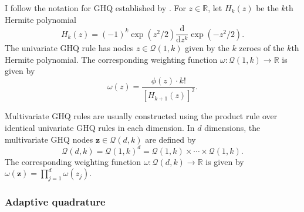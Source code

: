 \documentclass[a4paper, nobind]{templates/ociamthesis}
\begin{document}
I follow the notation for GHQ established by \textcite{bilodeau2022stochastic}.
For \(z \in \mathbb{R}\), let \(H_k(z)\) be the \(k\)th Hermite polynomial
\begin{equation}
H_k(z) = (-1)^k \exp(z^2 / 2) \frac{\text{d}}{\text{d}z^k} \exp(-z^2 / 2).
\end{equation}
The univariate GHQ rule has nodes \(z \in \mathcal{Q}(1, k)\) given by the \(k\) zeroes of the \(k\)th Hermite polynomial.
The corresponding weighting function \(\omega: \mathcal{Q}(1, k) \to \mathbb{R}\) is given by
\begin{equation}
\omega(z) = \frac{\phi(z) \cdot k!}{[H_{k + 1}(z)]^2}.
\end{equation}

Multivariate GHQ rules are usually constructed using the product rule over identical univariate GHQ rules in each dimension.
In \(d\) dimensions, the multivariate GHQ nodes \(\mathbf{z} \in \mathcal{Q}(d, k)\) are defined by
\begin{equation}
\mathcal{Q}(d, k) = \mathcal{Q}(1, k)^d = \mathcal{Q}(1, k) \times \cdots \times \mathcal{Q}(1, k).
\end{equation}
The corresponding weighting function \(\omega: \mathcal{Q}(d, k) \to \mathbb{R}\) is given by \(\omega(\mathbf{z}) = \prod_{j = 1}^d \omega(z_j)\).

\hypertarget{adaptive-quadrature}{%
\subsubsection{Adaptive quadrature}\label{adaptive-quadrature}}
\end{document}
